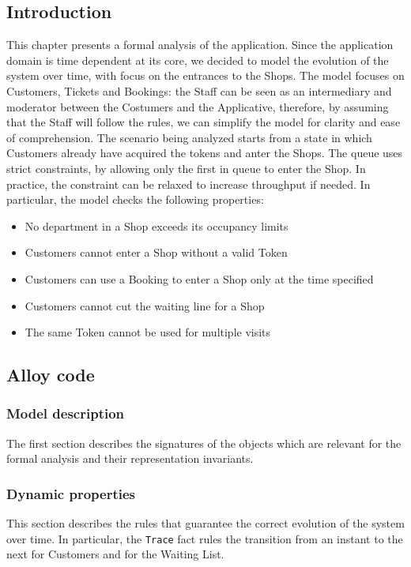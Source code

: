 \subsection{Introduction}
This chapter presents a formal analysis of the application. Since the application domain is time dependent at its core, we decided to model the evolution of the system over time, with focus on the entrances to the Shops. The model focuses on Customers, Tickets and Bookings: the Staff can be seen as an intermediary and moderator between the Costumers and the Applicative, therefore, by assuming that the Staff will follow the rules, we can simplify the model for clarity and ease of comprehension.
The scenario being analyzed starts from a state in which Customers already have acquired the tokens and anter the Shops. The queue uses strict constraints, by allowing only the first in queue to enter the Shop. In practice, the constraint can be relaxed to increase throughput if needed. 
In particular, the model checks the following properties:
\begin{itemize}
    \item No department in a Shop exceeds its occupancy limits
    \item Customers cannot enter a Shop without a valid Token
    \item Customers can use a Booking to enter a Shop only at the time specified
    \item Customers cannot cut the waiting line for a Shop
    \item The same Token cannot be used for multiple visits
\end{itemize}
\subsection{Alloy code}
\subsubsection{Model description}
The first section describes the signatures of the objects which are relevant for the formal analysis and their representation invariants.

\subsubsection{Dynamic properties}
This section describes the rules that guarantee the correct evolution of the system over time. In particular, the \texttt{Trace} fact rules the transition from an instant to the next for Customers and for the Waiting List. 


